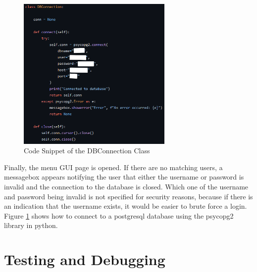             \begin{figure}[htbp]
                    \centering
                    \includegraphics[width=0.67\textwidth]{figures/DBConnection.png}
                    \caption{Code Snippet of the DBConnection Class}
                    \label{fig:DBConnection}
            \end{figure}
            
            Finally, the menu GUI page is opened. If there are no matching users, a messagebox appears notifying the user that either the username or password is invalid and the connection to the database is closed. Which one of the username and password being invalid is not specified for security reasons, because if there is an indication that the username exists, it would be easier to brute force a login.\\  

            Figure \ref{fig:DBConnection} shows how to connect to a postgresql database using the psycopg2 library in python. 
        
    \section{Testing and Debugging}
